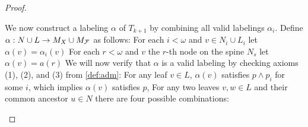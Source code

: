 \begin{proof}
\begin{outline}
        \2 We now construct a labeling $\alpha$ of $T_{k+1}$ by combining all valid labelings $\alpha_i$. Define $\alpha: N\cup L \rightarrow M_X \cup M_{\mathcal{F}}$ as follows:
            \3 For each $i<\omega$ and $v\in N_i \cup L_i$ let $\alpha(v)=\alpha_i(v)$ 
            \3 For each $r<\omega$ and $v$ the $r$-th node on the spine $N_s$ let $\alpha(v)=a(r)$
        \2 We will now verify that $\alpha$ is a valid labeling by checking axioms (1), (2), and (3) from \cref{def:adm}:
            \3 For any leaf $v\in L$, $\alpha(v)$ satisfies $p\land p_i$ for some $i$, which implies $\alpha(v)$ satisfies $p$,
            \3 For any two leaves $v,w\in L$ and their common ancestor $u\in N$ there are four possible combinations:
\end{outline}
\end{proof}
